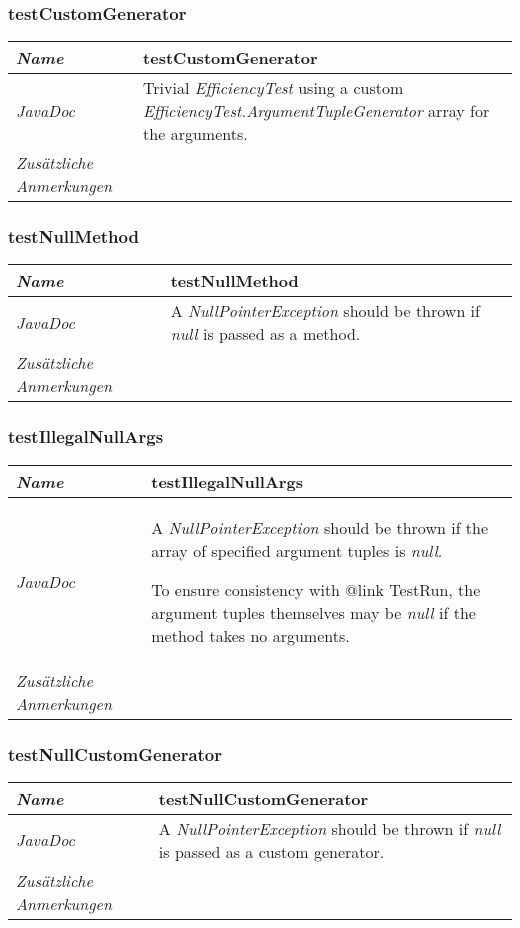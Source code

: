 \documentclass[a4paper]{report}
\begin{document}
\subsubsection{testCustomGenerator}
\begin{tabular}{p{2.3cm}  p{11.5cm}}
  \hline
 \textit{Name} & testCustomGenerator\\
  \hline
 \textit{JavaDoc} & Trivial \emph{EfficiencyTest} using a custom \emph{EfficiencyTest.ArgumentTupleGenerator} array for the arguments.\\
  \hline
 \textit{Zusätzliche Anmerkungen} & \\
  \hline
\end{tabular}

\subsubsection{testNullMethod}
\begin{tabular}{p{2.3cm}  p{11.5cm}}
  \hline
 \textit{Name} & testNullMethod\\
  \hline
 \textit{JavaDoc} & A \emph{NullPointerException} should be thrown if \emph{null} is passed as a method.\\
  \hline
 \textit{Zusätzliche Anmerkungen} & \\
  \hline
\end{tabular}

\subsubsection{testIllegalNullArgs}
\begin{tabular}{p{2.3cm}  p{11.5cm}}
  \hline
 \textit{Name} & testIllegalNullArgs\\
  \hline
 \textit{JavaDoc} & A \emph{NullPointerException} should be thrown if the array of specified argument tuples is \emph{null}.
 
	 To ensure consistency with {@link TestRun}, the argument tuples themselves may be \emph{null} if the method takes no arguments.\\
  \hline
 \textit{Zusätzliche Anmerkungen} & \\
  \hline
\end{tabular}

\subsubsection{testNullCustomGenerator}
\begin{tabular}{p{2.3cm}  p{11.5cm}}
  \hline
 \textit{Name} & testNullCustomGenerator\\
  \hline
 \textit{JavaDoc} & A \emph{NullPointerException} should be thrown if \emph{null} is passed as a custom generator.\\
  \hline
 \textit{Zusätzliche Anmerkungen} & \\
  \hline
\end{tabular}
\end{document}
